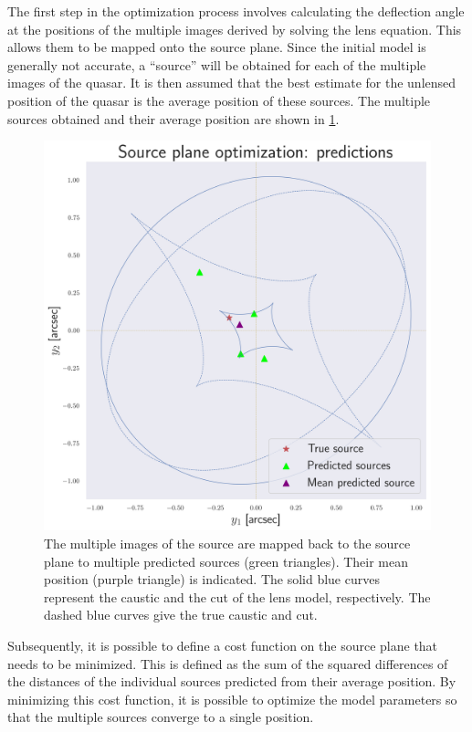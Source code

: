 The first step in the optimization process involves calculating the deflection angle at the positions of the multiple images derived by solving the lens equation. This allows them to be mapped onto the source plane. Since the initial model is generally not accurate, a ``source'' will be obtained for each of the multiple images of the quasar. It is then assumed that the best estimate for the unlensed position of the quasar is the average position of these sources. The multiple sources obtained and their average position are shown in \cref{fig:sp_pred}.

\begin{figure}
    \centering
    \includegraphics[width=0.8\linewidth, keepaspectratio]{img//chapter5//strong_lens/sp_pred.png}
    \caption[Initial sources predictions source plane optimization]{The multiple images of the source are mapped back to the source plane to multiple predicted sources (green triangles). Their mean position (purple triangle) is indicated. The solid blue curves represent the caustic and the cut of the lens model, respectively. The dashed blue curves give the true caustic and cut.}
    \label{fig:sp_pred}
\end{figure}

Subsequently, it is possible to define a cost function on the source plane that needs to be minimized. This is defined as the sum of the squared differences of the distances of the individual sources predicted from their average position.
By minimizing this cost function, it is possible to optimize the model parameters so that the multiple sources converge to a single position.

